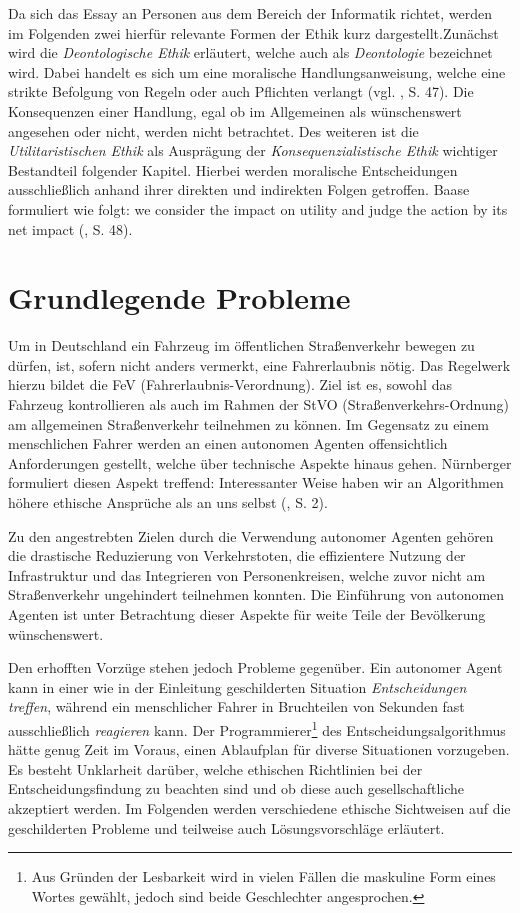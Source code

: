 \documentclass[a4paper, 12pt, titlepage]{scrartcl}
\begin{document}
	Da sich das Essay an Personen aus dem Bereich der Informatik richtet, werden im Folgenden zwei hierf\"ur relevante Formen der Ethik kurz dargestellt.Zun\"achst wird die \emph{Deontologische Ethik} erl\"autert, welche auch als \emph{Deontologie} bezeichnet wird. Dabei handelt es sich um eine moralische Handlungsanweisung, welche eine strikte Befolgung von Regeln oder auch Pflichten verlangt (vgl. \autocite{baase:fire}, S. 47). Die Konsequenzen einer Handlung, egal ob im Allgemeinen als w\"unschenswert angesehen oder nicht, werden nicht betrachtet. Des weiteren ist die \emph{Utilitaristischen Ethik} als Auspr\"agung der \emph{Konsequenzialistische Ethik} wichtiger Bestandteil folgender Kapitel. Hierbei werden moralische Entscheidungen ausschlie\ss lich anhand ihrer direkten und indirekten Folgen getroffen. Baase \autocite{baase:fire} formuliert wie folgt: \glqq we consider the impact on utility and judge the action by its net impact\grqq{} (\autocite{baase:fire}, S. 48).
\section{Grundlegende Probleme}
	Um in Deutschland ein Fahrzeug im \"offentlichen Stra\ss enverkehr bewegen zu d\"urfen, ist, sofern nicht anders vermerkt, eine Fahrerlaubnis n\"otig. Das Regelwerk hierzu bildet die FeV (Fahrerlaubnis-Verordnung). Ziel ist es, sowohl das Fahrzeug kontrollieren als auch im Rahmen der StVO (Stra\ss enverkehrs-Ordnung) am allgemeinen Stra\ss enverkehr teilnehmen zu k\"onnen. Im Gegensatz zu einem menschlichen Fahrer werden an einen autonomen Agenten offensichtlich Anforderungen gestellt, welche \"uber technische Aspekte hinaus gehen. N\"urnberger \autocite{nunu2016} formuliert diesen Aspekt treffend: \glqq Interessanter Weise haben wir an Algorithmen höhere ethische Ansprüche als an uns selbst\grqq{} (\cite{nunu2016}, S. 2).

	Zu den angestrebten Zielen durch die Verwendung autonomer Agenten geh\"oren die drastische Reduzierung von Verkehrstoten, die effizientere Nutzung der Infrastruktur und das Integrieren von Personenkreisen, welche zuvor nicht am Stra\ss enverkehr ungehindert teilnehmen konnten. Die Einf\"uhrung von autonomen Agenten ist unter Betrachtung dieser Aspekte f\"ur weite Teile der Bev\"olkerung w\"unschenswert.
	
	Den erhofften Vorz\"uge stehen jedoch Probleme gegen\"uber. Ein autonomer Agent kann in einer wie in der Einleitung geschilderten Situation \emph{Entscheidungen treffen}, w\"ahrend ein menschlicher Fahrer in Bruchteilen von Sekunden fast ausschlie\ss lich \emph{reagieren} kann. Der Programmierer\footnote{Aus Gr\"unden der Lesbarkeit wird in vielen F\"allen die maskuline Form eines Wortes gew\"ahlt, jedoch sind beide Geschlechter angesprochen.} des Entscheidungsalgorithmus h\"atte genug Zeit im Voraus, einen Ablaufplan f\"ur diverse Situationen vorzugeben. Es besteht Unklarheit dar\"uber, welche ethischen Richtlinien bei der Entscheidungsfindung zu beachten sind und ob diese auch gesellschaftliche akzeptiert werden. Im Folgenden werden verschiedene ethische Sichtweisen auf die geschilderten Probleme und teilweise auch L\"osungsvorschl\"age erl\"autert.   
\end{document}
